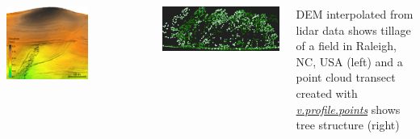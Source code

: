 \documentclass[25pt, margin=0mm, innermargin=25mm, blockverticalspace=25mm, colspace=25mm, subcolspace=8mm]{tikzposter}
\newcommand{\gamodule}[1]{\href{http://grass.osgeo.org/grass74/manuals/addons/#1.html}{\emph{#1}}}
\begin{document}
\begin{columns}
{\centering
\begin{minipage}{0.4\linewidth}
\centering
\includegraphics[width=0.7\textwidth]{elevation_lidar}
\end{minipage}
~
\begin{minipage}{0.55\linewidth}
\centering
\includegraphics[width=\textwidth]{lidar_profile}
\end{minipage}
\vspace{2mm}
\begin{center}
DEM interpolated from lidar data shows tillage of a field in Raleigh, NC, USA (left)
and a point cloud transect created with \gamodule{v.profile.points} shows tree structure (right)
\end{center}

}

\end{columns}
\end{document}
